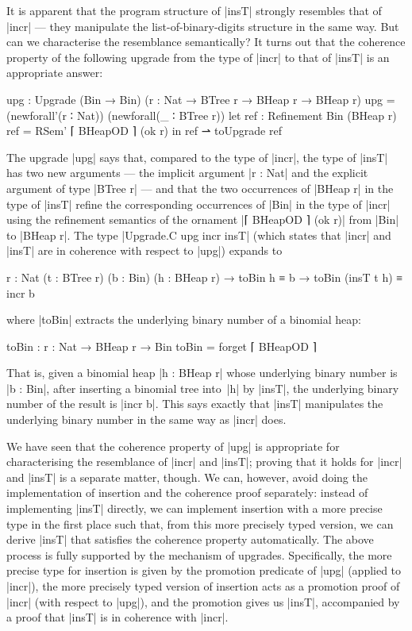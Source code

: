It is apparent that the program structure of |insT| strongly resembles that of |incr| --- they manipulate the list-of-binary-digits structure in the same way.
But can we characterise the resemblance semantically?
It turns out that the coherence property of the following upgrade from the type of |incr| to that of |insT| is an appropriate answer:
\begin{code}
upg : Upgrade (Bin → Bin) ({r : Nat} → BTree r → BHeap r → BHeap r)
upg =  (newforall'(r ∶ Nat)) (newforall(_ ∶ BTree r))
         let  ref : Refinement Bin (BHeap r)
              ref = RSem' ⌈ BHeapOD ⌉ (ok r)
         in   ref ⇀ toUpgrade ref
\end{code}
The upgrade |upg| says that, compared to the type of |incr|, the type of |insT| has two new arguments --- the implicit argument |r : Nat| and the explicit argument of type |BTree r| --- and that the two occurrences of |BHeap r| in the type of |insT| refine the corresponding occurrences of |Bin| in the type of |incr| using the refinement semantics of the ornament |⌈ BHeapOD ⌉ (ok r)| from |Bin| to |BHeap r|.
The type |Upgrade.C upg incr insT| (which states that |incr| and |insT| are in coherence with respect to |upg|) expands to
\begin{code}
{r : Nat} (t : BTree r) (b : Bin) (h : BHeap r) →
toBin h ≡ b → toBin (insT t h) ≡ incr b
\end{code}
where |toBin| extracts the underlying binary number of a binomial heap:
\begin{code}
toBin : {r : Nat} → BHeap r → Bin
toBin = forget ⌈ BHeapOD ⌉
\end{code}
That is, given a binomial heap |h : BHeap r| whose underlying binary number is |b : Bin|, after inserting a binomial tree into~|h| by |insT|, the underlying binary number of the result is |incr b|.
This says exactly that |insT| manipulates the underlying binary number in the same way as |incr| does.

We have seen that the coherence property of |upg| is appropriate for characterising the resemblance of |incr| and |insT|; proving that it holds for |incr| and |insT| is a separate matter, though.
We can, however, avoid doing the implementation of insertion and the coherence proof separately:
instead of implementing |insT| directly, we can implement insertion with a more precise type in the first place such that, from this more precisely typed version, we can derive |insT| that satisfies the coherence property automatically.
The above process is fully supported by the mechanism of upgrades.
Specifically, the more precise type for insertion is given by the promotion predicate of |upg| (applied to |incr|), the more precisely typed version of insertion acts as a promotion proof of |incr| (with respect to |upg|), and the promotion gives us |insT|, accompanied by a proof that |insT| is in coherence with |incr|.

